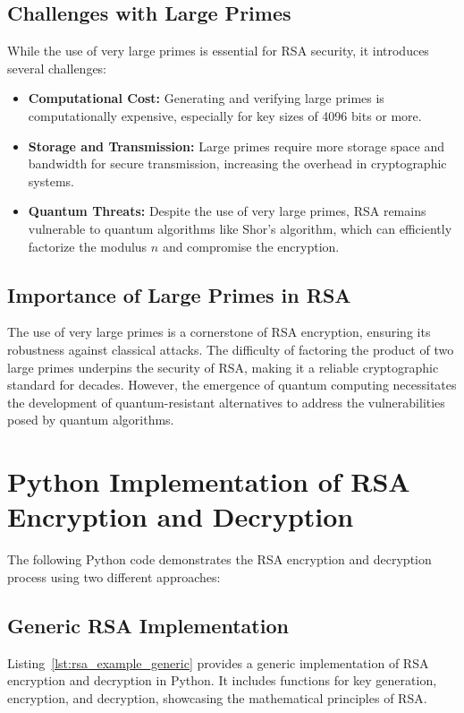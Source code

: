 \documentclass[12pt,a4paper]{report}
\begin{document}
\subsection{Challenges with Large Primes}
While the use of very large primes is essential for RSA security, it introduces several challenges:
\begin{itemize}
    \item \textbf{Computational Cost:} Generating and verifying large primes is computationally expensive, especially for key sizes of 4096 bits or more.
    \item \textbf{Storage and Transmission:} Large primes require more storage space and bandwidth for secure transmission, increasing the overhead in cryptographic systems.
    \item \textbf{Quantum Threats:} Despite the use of very large primes, RSA remains vulnerable to quantum algorithms like Shor's algorithm, which can efficiently factorize the modulus \( n \) and compromise the encryption.
\end{itemize}

\subsection{Importance of Large Primes in RSA}
The use of very large primes is a cornerstone of RSA encryption, ensuring its robustness against classical attacks. The difficulty of factoring the product of two large primes underpins the security of RSA, making it a reliable cryptographic standard for decades. However, the emergence of quantum computing necessitates the development of quantum-resistant alternatives to address the vulnerabilities posed by quantum algorithms.

\section{Python Implementation of RSA Encryption and Decryption}
The following Python code demonstrates the RSA encryption and decryption process using two different approaches:

\subsection{Generic RSA Implementation}
Listing~\ref{lst:rsa_example_generic} provides a generic implementation of RSA encryption and decryption in Python. It includes functions for key generation, encryption, and decryption, showcasing the mathematical principles of RSA.
\end{document}
